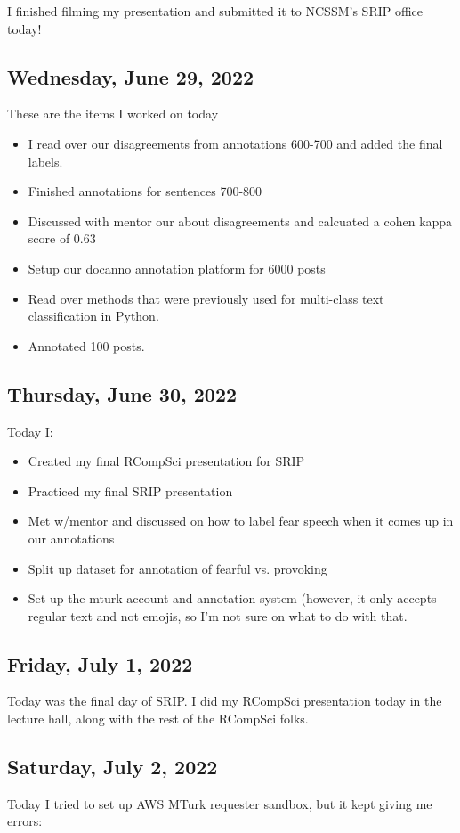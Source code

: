 \documentclass[11pt,letterpaper]{article}
\begin{document}
I finished filming my presentation and submitted it to NCSSM's SRIP office today!

\subsection{Wednesday, June 29, 2022}
These are the items I worked on today
\begin{itemize}
    \item I read over our disagreements from annotations 600-700 and added the final labels.
    \item Finished annotations for sentences 700-800
    \item Discussed with mentor our about disagreements and calcuated a cohen kappa score of 0.63
    \item Setup our docanno annotation platform for 6000 posts
    \item Read over methods that were previously used for multi-class text classification in Python.
    \item Annotated 100 posts.
\end{itemize}

\subsection{Thursday, June 30, 2022}
Today I:
\begin{itemize}
    \item Created my final RCompSci presentation for SRIP
    \item Practiced my final SRIP presentation
    \item Met w/mentor and discussed on how to label fear speech when it comes up in our annotations
    \item Split up dataset for annotation of fearful vs. provoking
    \item Set up the mturk account and annotation system (however, it only accepts regular text and not emojis, so I'm not sure on what to do with that.
\end{itemize}

\subsection{Friday, July 1, 2022}
Today was the final day of SRIP. I did my RCompSci presentation today in the lecture hall, along with the rest of the RCompSci folks.

\subsection{Saturday, July 2, 2022}
Today I tried to set up AWS MTurk requester sandbox, but it kept giving me errors:
\end{document}
